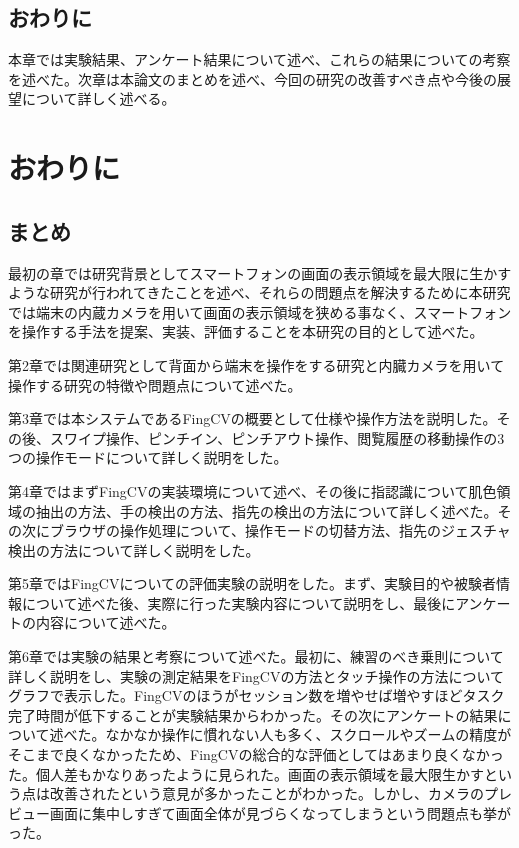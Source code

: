 \documentclass[11pt,a4j, titlepage]{jarticle} %
\begin{document}
\subsection{おわりに}
本章では実験結果、アンケート結果について述べ、これらの結果についての考察を述べた。次章は本論文のまとめを述べ、今回の研究の改善すべき点や今後の展望について詳しく述べる。

\newpage
\section{おわりに}
\subsection{まとめ}
最初の章では研究背景としてスマートフォンの画面の表示領域を最大限に生かすような研究が行われてきたことを述べ、それらの問題点を解決するために本研究では端末の内蔵カメラを用いて画面の表示領域を狭める事なく、スマートフォンを操作する手法を提案、実装、評価することを本研究の目的として述べた。

第2章では関連研究として背面から端末を操作をする研究と内臓カメラを用いて操作する研究の特徴や問題点について述べた。

第3章では本システムであるFingCVの概要として仕様や操作方法を説明した。その後、スワイプ操作、ピンチイン、ピンチアウト操作、閲覧履歴の移動操作の3つの操作モードについて詳しく説明をした。

第4章ではまずFingCVの実装環境について述べ、その後に指認識について肌色領域の抽出の方法、手の検出の方法、指先の検出の方法について詳しく述べた。その次にブラウザの操作処理について、操作モードの切替方法、指先のジェスチャ検出の方法について詳しく説明をした。

第5章ではFingCVについての評価実験の説明をした。まず、実験目的や被験者情報について述べた後、実際に行った実験内容について説明をし、最後にアンケートの内容について述べた。

第6章では実験の結果と考察について述べた。最初に、練習のべき乗則について詳しく説明をし、実験の測定結果をFingCVの方法とタッチ操作の方法についてグラフで表示した。FingCVのほうがセッション数を増やせば増やすほどタスク完了時間が低下することが実験結果からわかった。その次にアンケートの結果について述べた。なかなか操作に慣れない人も多く、スクロールやズームの精度がそこまで良くなかったため、FingCVの総合的な評価としてはあまり良くなかった。個人差もかなりあったように見られた。画面の表示領域を最大限生かすという点は改善されたという意見が多かったことがわかった。しかし、カメラのプレビュー画面に集中しすぎて画面全体が見づらくなってしまうという問題点も挙がった。
\end{document}
